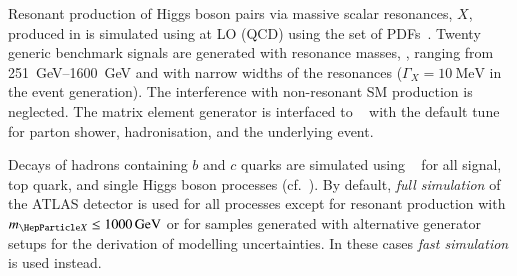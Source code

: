 Resonant production of Higgs boson pairs via massive scalar
resonances, $X$, produced in \ggF is simulated using \MGNLO at LO
(QCD) using the \NNPDF[2.3lo] set of PDFs~\cite{Ball:2012cx}. Twenty
generic benchmark signals are generated with resonance masses, \mX,
ranging from \SIrange{251}{1600}{\GeV} and with narrow widths of the
resonances ($\Gamma_{X} = \SI{10}{\MeV}$ in the event generation). The
interference with non-resonant SM \HH production is neglected. The
matrix element generator is interfaced to
\HERWIG[7.1]~\cite{Gieseke:2012ft,Bellm:2017jjp} with the default tune
for parton shower, hadronisation, and the underlying event.

Decays of hadrons containing $b$ and $c$ quarks are simulated using
\EVTGEN~\cite{Lange:2001uf} for all signal, top quark, and single
Higgs boson processes (cf.~). By default,
\emph{full simulation} of the ATLAS detector is used for all processes
except for resonant \HH production with $\mX \leq \SI{1000}{\GeV}$ or
for samples generated with alternative generator setups for the
derivation of modelling uncertainties. In these cases \emph{fast
  simulation} is used instead.

